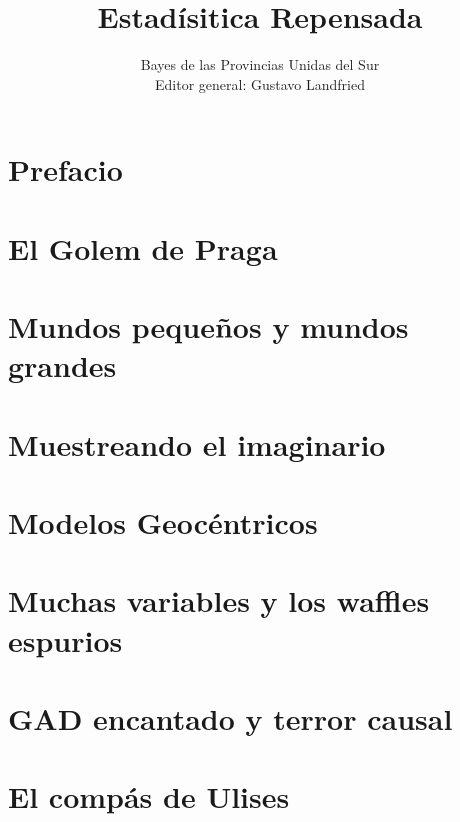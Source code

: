 \documentclass[a4paper,10pt]{book}
\title{\Huge Estad\'isitica Repensada}
\author{\LARGE Bayes de las Provincias Unidas del Sur \\ \vspace{12cm} \large Editor general: Gustavo Landfried}
\begin{document}
\maketitle

\tableofcontents

\chapter{Prefacio}



\chapter{El Golem de Praga}



\chapter{Mundos peque\~nos y mundos grandes}



\chapter{Muestreando el imaginario}



\chapter{Modelos Geoc\'entricos}



\chapter{Muchas variables y los waffles espurios}



\chapter{GAD encantado y terror causal}



\chapter{El comp\'as de Ulises}


\end{document}
